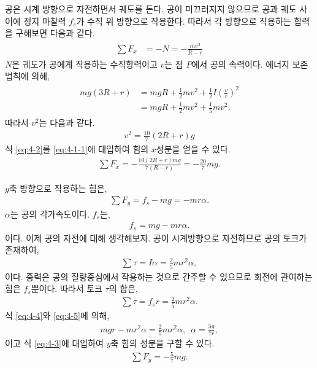 \documentclass[floatfix,nofootinbib,superscriptaddress,fleqn]{revtex4-2}
\begin{document}
\begin{itemize}
  공은 시계 방향으로 자전하면서 궤도를 돈다. 공이 미끄러지지 않으므로 공과 궤도 사이에 
  정지 마찰력 $f_s$가 수직 위 방향으로 작용한다.
  따라서 각 방향으로 작용하는 합력을 구해보면 다음과 같다.
  \begin{align}\label{eq:4-1-1}
    \begin{split}
      \sum F_x &= -N = -\frac{mv^2}{R-r}
    \end{split}
  \end{align}
  $N$은 궤도가 공에게 작용하는 수직항력이고
  $v$는 점 $P$에서 공의 속력이다. 
  에너지 보존 법칙에 의해,
  \begin{align}
    \begin{split}
      mg(3R+r) &= mgR + \frac{1}{2}mv^2 + \frac{1}{2}I\left(\frac{v}{r}\right)^2  \\
      &= mgR + \frac{1}{2}mv^2 + \frac{1}{5}mv^2.
    \end{split}
  \end{align}
  따라서 $v^2$는 다음과 같다.
  \begin{align}\label{eq:4-2}
    v^2 = \frac{10}{7}(2R+r)g
  \end{align}
  식 \eqref{eq:4-2}를 \eqref{eq:4-1-1}에 대입하여 힘의 $x$성분을 얻을 수 있다.
  \begin{align}
    \sum F_x = -\frac{10(2R+r)mg}{7(R-r)} = -\frac{20}{7}mg.
  \end{align}
  
  $y$축 방향으로 작용하는 힘은,
  \begin{align}\label{eq:4-3}
    \sum F_y = f_s - mg = -mr\alpha.
  \end{align}
  $\alpha$는 공의 각가속도이다. $f_s$는,
  \begin{align}\label{eq:4-4}
    f_s = mg-mr\alpha.
  \end{align}
  이다. 이제 공의 자전에 대해 생각해보자.
  공이 시계방향으로 자전하므로 공의 토크가 존재하여,
  \begin{align}
    \sum \tau = I\alpha = \frac{2}{5}mr^2\alpha,
  \end{align}
  이다. 중력은 공의 질량중심에서 작용하는 것으로 간주할 수 있으므로 회전에 관여하는 힘은 
  $f_s$뿐이다. 따라서 토크 $\tau$의 합은,
  \begin{align}\label{eq:4-5}
    \sum \tau = f_s r = \frac{2}{5}mr^2\alpha.
  \end{align}
  식 \eqref{eq:4-4}와 \eqref{eq:4-5}에 의해,
  \begin{align}
    mgr - mr^2\alpha = \frac{2}{5}mr^2\alpha,\,\,\,
    \alpha = \frac{5g}{7r},
  \end{align}
  이고 식 \eqref{eq:4-3}에 대입하여 $y$축 힘의 성분을 구할 수 있다.
  \begin{align}
    \sum F_y = -\frac{5}{7}mg.
  \end{align}

\end{itemize}
\end{document}
